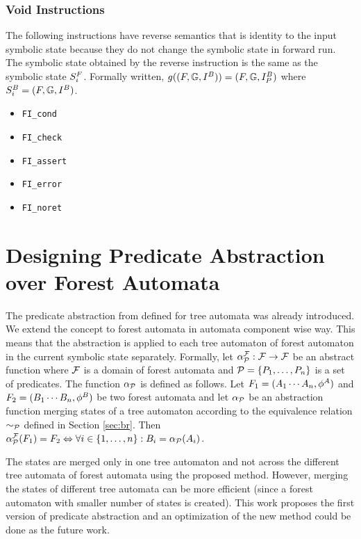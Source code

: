 \subsubsection{Void Instructions}
The following instructions have reverse semantics that is identity
to the input symbolic state 
because they do not change the symbolic state in forward run.
The symbolic state obtained by the reverse instruction
is the same as the symbolic state $S^{F}_{i}$.
Formally written, $g((F, \mathbb{G}, I^{B})) = 
			(F, \mathbb{G}, I^{B}_{P})$
			where $S^{B}_{i} = (F, \mathbb{G}, I^{B})$.

\begin{itemize}
	
	\item {\tt FI\_cond}
	
	\item {\tt FI\_check}
	
	\item {\tt FI\_assert}
	
	\item {\tt FI\_error}
	
	\item {\tt FI\_noret}

\end{itemize}


\section{Designing Predicate Abstraction over Forest Automata}
\label{sec:padesign}

The predicate abstraction from \cite{artmc} defined for tree automata
was already introduced.
We extend the concept to forest automata in automata component wise way.
This means that the abstraction is applied to each tree automaton of
forest automaton in the current symbolic state separately.
Formally, let $\alpha_{\mathcal{P}}^{\mathcal{F}}: \mathcal{F} \rightarrow \mathcal{F}$ be an abstract function where
$\mathcal{F}$ is a domain of forest automata and $\mathcal{P} = \{P_1, \ldots, P_n\}$ is a set of predicates.
The function $\alpha_{\mathcal{P}}$ is defined as follows.
Let $F_1=(A_1 \cdots A_n, \phi^{A})$ and $F_2=(B_1 \cdots B_n, \phi^{B})$ be two forest automata
and let $\alpha_{\mathcal{P}}$ be an abstraction function merging states of a tree automaton according
to the equivalence relation $\sim_{\mathcal{P}}$ defined in Section \ref{sec:br}.
Then $\alpha_{\mathcal{P}}^{\mathcal{F}}(F_1) = F_2 \Leftrightarrow \forall i \in \{1,\ldots,n\}: B_i = \alpha_{\mathcal{P}}(A_i)$.

The states are merged only in one tree automaton and not across the different
tree automata of forest automata using the proposed method.
However, merging the states of different tree automata can be more efficient (since
a forest automaton with smaller number of states is created).
This work proposes the first version of predicate abstraction and 
an optimization of the new method could be done as the future work.

